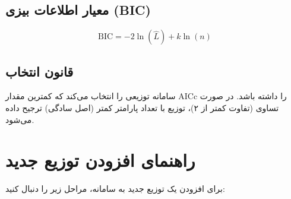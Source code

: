 \documentclass[a4paper,12pt]{article}
\begin{document}
\subsection{معیار اطلاعات بیزی (BIC)}

\begin{equation}
\text{BIC} = -2\ln(\hat{L}) + k\ln(n)
\end{equation}

\subsection{قانون انتخاب}

سامانه توزیعی را انتخاب می‌کند که کمترین مقدار AICc را داشته باشد. در صورت تساوی (تفاوت کمتر از ۲)، توزیع با تعداد پارامتر کمتر (اصل سادگی) ترجیح داده می‌شود.

\section{راهنمای افزودن توزیع جدید}

برای افزودن یک توزیع جدید به سامانه، مراحل زیر را دنبال کنید:
\end{document}
